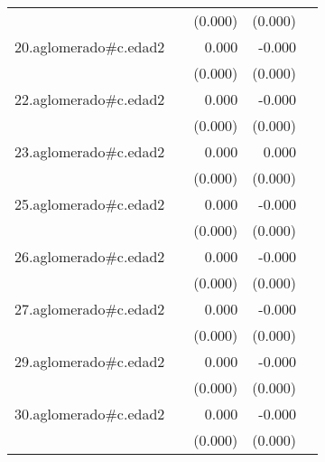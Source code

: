 {\begin{longtable}{l*{4}{D{.}{.}{-1}}}
            &                     &     (0.000)         &     (0.000)         &                     \\
\addlinespace
20.aglomerado#c.edad2&                     &       0.000         &      -0.000\sym{*}  &                     \\
            &                     &     (0.000)         &     (0.000)         &                     \\
\addlinespace
22.aglomerado#c.edad2&                     &       0.000\sym{*}  &      -0.000         &                     \\
            &                     &     (0.000)         &     (0.000)         &                     \\
\addlinespace
23.aglomerado#c.edad2&                     &       0.000\sym{***}&       0.000         &                     \\
            &                     &     (0.000)         &     (0.000)         &                     \\
\addlinespace
25.aglomerado#c.edad2&                     &       0.000         &      -0.000         &                     \\
            &                     &     (0.000)         &     (0.000)         &                     \\
\addlinespace
26.aglomerado#c.edad2&                     &       0.000\sym{**} &      -0.000         &                     \\
            &                     &     (0.000)         &     (0.000)         &                     \\
\addlinespace
27.aglomerado#c.edad2&                     &       0.000\sym{*}  &      -0.000\sym{*}  &                     \\
            &                     &     (0.000)         &     (0.000)         &                     \\
\addlinespace
29.aglomerado#c.edad2&                     &       0.000\sym{**} &      -0.000         &                     \\
            &                     &     (0.000)         &     (0.000)         &                     \\
\addlinespace
30.aglomerado#c.edad2&                     &       0.000         &      -0.000\sym{*}  &                     \\
            &                     &     (0.000)         &     (0.000)         &                     \\

\end{longtable}}
